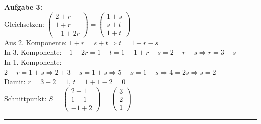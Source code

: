 \documentclass[12pt,a4paper]{article}
\begin{document}
\textbf{Aufgabe 3:} \\
Gleichsetzen: $\begin{pmatrix}2+r\\1+r\\-1+2r\end{pmatrix} = \begin{pmatrix}1+s\\s+t\\1+t\end{pmatrix}$ \\
Aus 2. Komponente: $1+r = s+t \Rightarrow t = 1+r-s$ \\
In 3. Komponente: $-1+2r = 1+t = 1+1+r-s = 2+r-s \Rightarrow r = 3-s$ \\
In 1. Komponente: $2+r = 1+s \Rightarrow 2+3-s = 1+s \Rightarrow 5-s = 1+s \Rightarrow 4 = 2s \Rightarrow s = 2$ \\
Damit: $r = 3-2 = 1$, $t = 1+1-2 = 0$ \\
Schnittpunkt: $S = \begin{pmatrix}2+1\\1+1\\-1+2\end{pmatrix} = \begin{pmatrix}3\\2\\1\end{pmatrix}$
\begin{center}\rule{0.8\linewidth}{0.4pt}\end{center}
\end{document}

